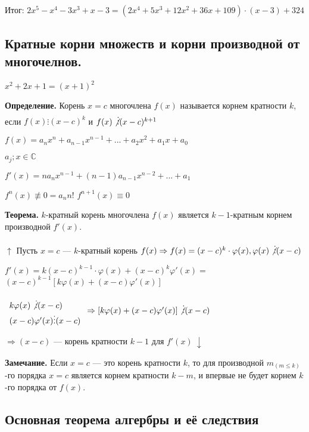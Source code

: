 \documentclass{article}
\begin{document}
    Итог:
    \(2x^5 - x^4 - 3x^3 + x - 3 = (2x^4 + 5x^3 + 12x^2 + 36x + 109) \cdot (x - 3) + 324\)
    

    
    \subsection{Кратные корни множеств и корни производной от многочелнов.}

    \( x^2 + 2x + 1 = (x+1)^2 \)

    \textbf{Определение.} Корень \(x=c\) многочлена \(f(x)\) называется корнем кратности \(k\), если \(f(x) \vdots (x-c)^k\) и \(f(x) \not \vdots (x-c)^{k+1}\)

    \( f(x) = a_{n}x^{n} + a_{n-1}x^{n-1} +...+ a_{2}x^{2} + a_{1}x + a_{0} \)

    \( a_j; x \in \mathbb{C}\) %
    
    \( f'(x) = na_{n}x^{n-1} + (n-1)a_{n-1}x^{n-2} + ... + a_1 \)

    \( f^{n}(x) \not \equiv 0 = a_{n}n!\)
    \( f^{n + 1}(x) \equiv  0 \)
    

    \textbf{Теорема.} \(k\)-кратный корень многочлена \(f(x)\) является \(k-1\)-кратным корнем производной \(f'(x)\).
    
    \(\uparrow\) Пусть \(x = c\) --- \(k\)-кратный корень \(f(x) \Rightarrow f(x) = (x-c)^k\cdot \varphi(x), \varphi(x)\not \vdots (x-c)\)
   
    \(f'(x) = k(x-c)^{k-1}\cdot \varphi(x) + (x-c)^k\varphi'(x) =\)
    \( (x-c)^{k-1}[k\varphi(x) + (x-c)\varphi'(x)]\)
    
    \(\begin{array}{l}
        k\varphi(x) \not \vdots (x-c)\\
        (x-c)\varphi'(x) \vdots (x-c)
    \end{array} \Rightarrow [k\varphi(x) + (x-c)\varphi'(x)] \not \vdots (x-c) \)
   
    \(\Rightarrow (x-c)\) --- корень кратности \(k-1\) для \(f'(x)\ \downarrow\)
    
    \textbf{Замечание.} Если \(x = c\) --- это корень кратности \(k\), то для производной \(m_{(m \leq k)}\)-го порядка \(x = c\) является корнем кратности \(k-m\), и впервые не будет корнем \(k\)-го порядка от \(f(x)\).
    
    

    
    \subsection{Основная теорема алгербры и её следствия}
    
\end{document}
